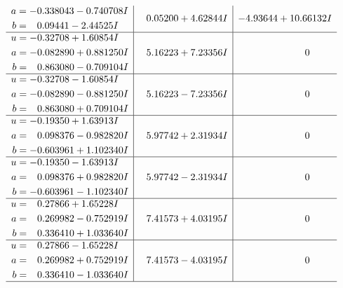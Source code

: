 \documentclass[1p]{elsarticle_modified}
\theoremstyle{definition}
\begin{document}
$$\begin{array}{c|c|c}
\begin{aligned}
a &= -0.338043 - 0.740708 I \\
b &= \phantom{-}0.09441 - 2.44525 I\end{aligned}
 & \phantom{-}0.05200 + 4.62844 I & -4.93644 + 10.66132 I \\ \hline\begin{aligned}
u &= -0.32708 + 1.60854 I \\
a &= -0.082890 + 0.881250 I \\
b &= \phantom{-}0.863080 - 0.709104 I\end{aligned}
 & \phantom{-}5.16223 + 7.23356 I & \phantom{-0.000000 } 0 \\ \hline\begin{aligned}
u &= -0.32708 - 1.60854 I \\
a &= -0.082890 - 0.881250 I \\
b &= \phantom{-}0.863080 + 0.709104 I\end{aligned}
 & \phantom{-}5.16223 - 7.23356 I & \phantom{-0.000000 } 0 \\ \hline\begin{aligned}
u &= -0.19350 + 1.63913 I \\
a &= \phantom{-}0.098376 - 0.982820 I \\
b &= -0.603961 + 1.102340 I\end{aligned}
 & \phantom{-}5.97742 + 2.31934 I & \phantom{-0.000000 } 0 \\ \hline\begin{aligned}
u &= -0.19350 - 1.63913 I \\
a &= \phantom{-}0.098376 + 0.982820 I \\
b &= -0.603961 - 1.102340 I\end{aligned}
 & \phantom{-}5.97742 - 2.31934 I & \phantom{-0.000000 } 0 \\ \hline\begin{aligned}
u &= \phantom{-}0.27866 + 1.65228 I \\
a &= \phantom{-}0.269982 - 0.752919 I \\
b &= \phantom{-}0.336410 + 1.033640 I\end{aligned}
 & \phantom{-}7.41573 + 4.03195 I & \phantom{-0.000000 } 0 \\ \hline\begin{aligned}
u &= \phantom{-}0.27866 - 1.65228 I \\
a &= \phantom{-}0.269982 + 0.752919 I \\
b &= \phantom{-}0.336410 - 1.033640 I\end{aligned}
 & \phantom{-}7.41573 - 4.03195 I & \phantom{-0.000000 } 0\\
 \hline 
 \end{array}$$\newpage\newpage\renewcommand{\arraystretch}{1}
\end{document}
